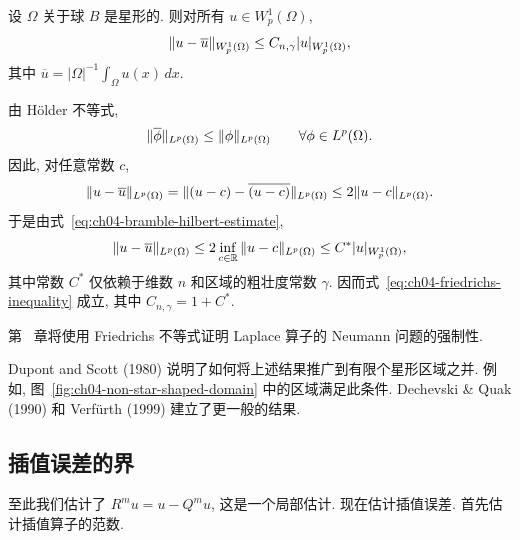 \setcounter{thmcount}{13}
\begin{Lemma}
\label{lem:ch04-friedrichs-inequality}
设 $\Omega$ 关于球 $B$ 是星形的. 则对所有 $u\in W_p^1(\Omega)$,
\begin{equation}
\MathBookFormulaID{formula-ch04-friedrichs-inequality}
\label{eq:ch04-friedrichs-inequality}
\|u-\overline u\|_{W_p^1(\Omega)}
\leq C_{n,\gamma}|u|_{W_p^1(\Omega)},
\end{equation}
其中 $\overline u=|\Omega|^{-1}\int_\Omega u(x)\,dx$.
\end{Lemma}
\begin{Proof}
由 Hölder 不等式,
\[
\MathBookFormulaID{formula-ch04-average-lp-bound}
\|\overline\phi\|_{L^p(\Omega)}\leq\|\phi\|_{L^p(\Omega)}
\qquad\forall\phi\in L^p(\Omega).
\]
因此, 对任意常数 $c$,
\[
\MathBookFormulaID{formula-ch04-friedrichs-constant-bound}
\|u-\overline u\|_{L^p(\Omega)}
=\|(u-c)-\overline{(u-c)}\|_{L^p(\Omega)}
\leq2\|u-c\|_{L^p(\Omega)}.
\]
于是由式~\eqref{eq:ch04-bramble-hilbert-estimate},
\[
\MathBookFormulaID{formula-ch04-friedrichs-bramble-hilbert-proof}
\|u-\overline u\|_{L^p(\Omega)}
\leq2\inf_{c\in\mathbb R}\|u-c\|_{L^p(\Omega)}
\leq C^*|u|_{W_p^1(\Omega)},
\]
其中常数 $C^*$ 仅依赖于维数 $n$ 和区域的粗壮度常数 $\gamma$. 因而式~\eqref{eq:ch04-friedrichs-inequality} 成立, 其中 $C_{n,\gamma}=1+C^*$.
\end{Proof}

\setcounter{thmcount}{15}
\begin{Remark}
\label{rem:ch04-friedrichs-neumann-application}
第~ 章将使用 Friedrichs 不等式证明 Laplace 算子的 Neumann 问题的强制性.
\end{Remark}

Dupont and Scott (1980) 说明了如何将上述结果推广到有限个星形区域之并. 例如, 图~\ref{fig:ch04-non-star-shaped-domain} 中的区域满足此条件. Dechevski \& Quak (1990) 和 Verfürth (1999) 建立了更一般的结果.

\subsection{插值误差的界}
\label{sec:ch04-interpolation-error-bounds}
\setcounter{thmcount}{0}
\setcounter{equation}{0}

至此我们估计了 $R^m u=u-Q^m u$, 这是一个局部估计. 现在估计插值误差. 首先估计插值算子的范数.


